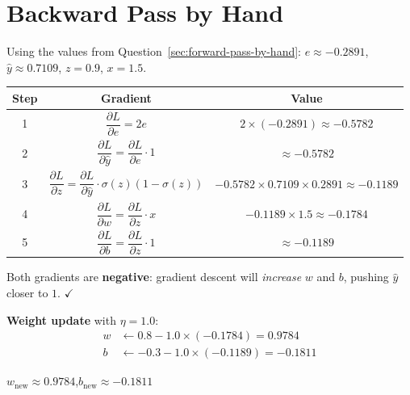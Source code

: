 \documentclass[11pt, a4paper]{article}
\begin{document}
\section{Backward Pass by Hand}

\begin{tcolorbox}[solutionbox]
Using the values from Question~\ref{sec:forward-pass-by-hand}:
$e \approx -0.2891$, $\hat{y} \approx 0.7109$, $z = 0.9$, $x = 1.5$.

\begin{center}
\begin{tabular}{ccc}
\toprule
Step & Gradient & Value \\
\midrule
1 & $\dfrac{\partial L}{\partial e} = 2e$
  & $2 \times (-0.2891) \approx -0.5782$ \\[1.2em]
2 & $\dfrac{\partial L}{\partial \hat{y}} = \dfrac{\partial L}{\partial e} \cdot 1$
  & $\approx -0.5782$ \\[1.2em]
3 & $\dfrac{\partial L}{\partial z} = \dfrac{\partial L}{\partial \hat{y}} \cdot \sigma(z)(1-\sigma(z))$
  & $-0.5782 \times 0.7109 \times 0.2891 \approx -0.1189$ \\[1.2em]
4 & $\dfrac{\partial L}{\partial w} = \dfrac{\partial L}{\partial z} \cdot x$
  & $-0.1189 \times 1.5 \approx -0.1784$ \\[1.2em]
5 & $\dfrac{\partial L}{\partial b} = \dfrac{\partial L}{\partial z} \cdot 1$
  & $\approx -0.1189$ \\[1.2em]
\bottomrule
\end{tabular}
\end{center}

Both gradients are \textbf{negative}: gradient descent will \emph{increase} $w$ and $b$,
pushing $\hat{y}$ closer to $1$. $\checkmark$

\medskip
\textbf{Weight update} with $\eta = 1.0$:
\begin{align*}
w &\leftarrow 0.8 - 1.0 \times (-0.1784) = 0.9784 \\
b &\leftarrow -0.3 - 1.0 \times (-0.1189) = -0.1811
\end{align*}

\begin{tcolorbox}[answerbox]
$w_{\text{new}} \approx 0.9784$,\quad $b_{\text{new}} \approx -0.1811$
\end{tcolorbox}
\end{tcolorbox}

\end{document}

